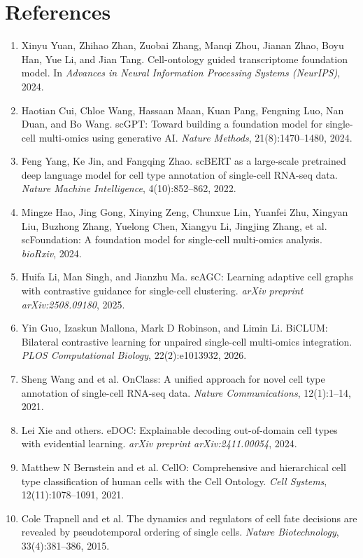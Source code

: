 \documentclass[11pt]{article}
\begin{document}
\section*{References}

\begin{enumerate}

\item Xinyu Yuan, Zhihao Zhan, Zuobai Zhang, Manqi Zhou, Jianan Zhao, Boyu Han, Yue Li, and Jian Tang. Cell-ontology guided transcriptome foundation model. In \textit{Advances in Neural Information Processing Systems (NeurIPS)}, 2024.

\item Haotian Cui, Chloe Wang, Hassaan Maan, Kuan Pang, Fengning Luo, Nan Duan, and Bo Wang. scGPT: Toward building a foundation model for single-cell multi-omics using generative AI. \textit{Nature Methods}, 21(8):1470--1480, 2024.

\item Feng Yang, Ke Jin, and Fangqing Zhao. scBERT as a large-scale pretrained deep language model for cell type annotation of single-cell RNA-seq data. \textit{Nature Machine Intelligence}, 4(10):852--862, 2022.

\item Mingze Hao, Jing Gong, Xinying Zeng, Chunxue Lin, Yuanfei Zhu, Xingyan Liu, Buzhong Zhang, Yuelong Chen, Xiangyu Li, Jingjing Zhang, et al. scFoundation: A foundation model for single-cell multi-omics analysis. \textit{bioRxiv}, 2024.

\item Huifa Li, Man Singh, and Jianzhu Ma. scAGC: Learning adaptive cell graphs with contrastive guidance for single-cell clustering. \textit{arXiv preprint arXiv:2508.09180}, 2025.

\item Yin Guo, Izaskun Mallona, Mark D Robinson, and Limin Li. BiCLUM: Bilateral contrastive learning for unpaired single-cell multi-omics integration. \textit{PLOS Computational Biology}, 22(2):e1013932, 2026.

\item Sheng Wang and et al. OnClass: A unified approach for novel cell type annotation of single-cell RNA-seq data. \textit{Nature Communications}, 12(1):1--14, 2021.

\item Lei Xie and others. eDOC: Explainable decoding out-of-domain cell types with evidential learning. \textit{arXiv preprint arXiv:2411.00054}, 2024.

\item Matthew N Bernstein and et al. CellO: Comprehensive and hierarchical cell type classification of human cells with the Cell Ontology. \textit{Cell Systems}, 12(11):1078--1091, 2021.

\item Cole Trapnell and et al. The dynamics and regulators of cell fate decisions are revealed by pseudotemporal ordering of single cells. \textit{Nature Biotechnology}, 33(4):381--386, 2015.

\end{enumerate}
\end{document}
